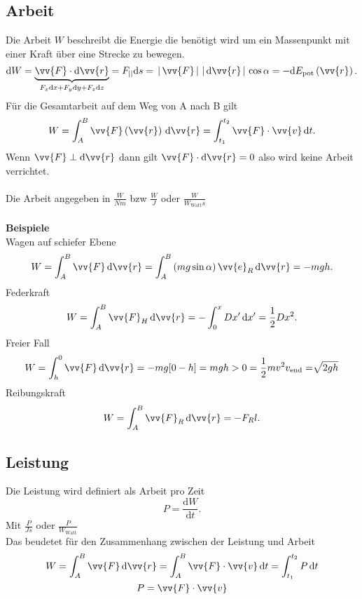 \documentclass[a4paper,12pt]{article}
\newcommand{\td}{\,\text{d}}
\begin{document}
\subsection{Arbeit}
Die Arbeit $W$ beschreibt die Energie die benötigt wird um ein Massenpunkt mit einer Kraft über eine Strecke zu bewegen.
\[ 
        \text{d}W=\underbrace{\vv{F}\cdot \text{d}\vv{r}}_{F_x\text{d}x+F_y\text{d}y+F_z\text{d}z}=F_{||}\text{d}s=\,|\, \vv{F}\,|\, \,|\, \text{d}\vv{r}\,|\, \cos \alpha =-\text{d}E_{\text{pot}}\left(\vv{r}\right)
.\] 
Für die Gesamtarbeit auf dem Weg von A nach B gilt
\[ 
        W=\int_{A}^{B}\vv{F}\left(\vv{r}\right)\td\vv{r}=\int_{t_1}^{t_2}\vv{F}\cdot \vv{v}\td t
.\] 
Wenn $\vv{F}\perp \text{d}\vv{r}$ dann gilt $\vv{F}\cdot \text{d}\vv{r}=0$ also wird keine Arbeit verrichtet.\\\\
Die Arbeit angegeben in $\tfrac{W}{Nm}$ bzw $\tfrac{W}{J}$ oder $\tfrac{W}{W_{\text{Watt}}s}$ 
\\\hfill\\\textbf{Beispiele}\\ 
Wagen auf schiefer Ebene
\[ 
        W=\int_{A}^{B}\vv{F}\td\vv{r}=\int_{A}^{B}\left(mg\sin \alpha \right)\vv{e}_R\td\vv{r}=-mgh
.\] 
Federkraft
\[ 
        W=\int_{A}^{B}\vv{F}_H\td\vv{r}=-\int_{0}^{x}Dx'\td x'=\dfrac{1}{2}Dx^2
.\] 
Freier Fall
\begin{gather*}
        W=\int_{h}^{0}\vv{F}\td\vv{r}=-mg[0-h]=mgh>0=\dfrac{1}{2}mv^2
        v_{\text{end}}=\sqrt[]{2gh} 
\end{gather*}
Reibungskraft
\[ 
        W=\int_{A}^{B}\vv{F}_R\td\vv{r}=-F_Rl
.\] 

\subsection{Leistung}
Die Leistung wird definiert als Arbeit pro Zeit
\[ 
        P=\dfrac{\text{d}W}{\text{d}t}
.\] 
Mit $\tfrac{P}{Js}$ oder $\tfrac{P}{W_{\text{Watt} }}$\\
Das beudetet für den Zusammenhang zwischen der Leistung und Arbeit
\begin{gather*}
        W=\int_{A}^{B}\vv{F}\td\vv{r}=\int_{A}^{B}\vv{F}\cdot \vv{v}\td t=\int_{t_1}^{t_2}P\td t\\
        P=\vv{F}\cdot \vv{v}
\end{gather*}
\end{document}
